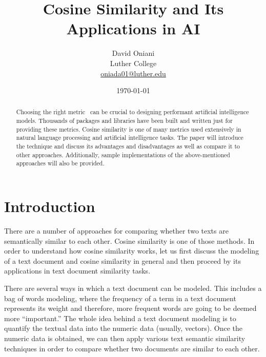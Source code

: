 \documentclass[11pt]{article}
\author{David Oniani\\
        Luther College\\
        \href{mailto:oniada01@luther.edu}{oniada01@luther.edu}}
\title{\textbf{Cosine Similarity and Its Applications in AI}}
\date{\today}
\begin{document}
\maketitle


\begin{abstract}
  \noindent Choosing the right metric~\cite{thomas2020} can be crucial to
  designing performant artificial intelligence models. Thousands of packages
  and libraries have been built and written just for providing these metrics.
  Cosine similarity is one of many metrics used extensively in natural language
  processing and artificial intelligence tasks. The paper will introduce the
  technique and discuss its advantages and disadvantages as well as compare it
  to other approaches. Additionally, sample implementations of the
  above-mentioned approaches will also be provided.
\end{abstract}


\newpage
\tableofcontents
\newpage


\section{Introduction}

There are a number of approaches for comparing whether two texts are
semantically similar to each other. Cosine similarity is one of those methods.
In order to understand how cosine similarity works, let us first discuss the
modeling of a text document and cosine similarity in general and then proceed
by its applications in text document similarity tasks.

\bigskip

There are several ways in which a text document can be modeled. This includes a
bag of words modeling, where the frequency of a term in a text document
represents its weight and therefore, more frequent words are going to be deemed
more ``important.'' The whole idea behind a text document modeling is to
quantify the textual data into the numeric data (usually, vectors). Once the
numeric data is obtained, we can then apply various text semantic similarity
techniques in order to compare whether two documents are similar to each other.
\end{document}
